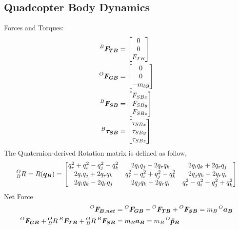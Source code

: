 \subsection{Quadcopter Body Dynamics}
Forces and Torques:
\begin{align*}
  \prescript{B}{}{\bm{F_{TB}}} &=
  \begin{bmatrix}
    0 \\ 0 \\ F_{TB}
  \end{bmatrix} \\
  \prescript{O}{}{\bm{F_{GB}}} &=
  \begin{bmatrix}
    0 \\ 0 \\ -m_b g
  \end{bmatrix} \\
  \prescript{B}{}{\bm{F_{SB}}} &=
  \begin{bmatrix}
    F_{SBx} \\ F_{SBy} \\ F_{SBz} 
  \end{bmatrix} \\
  \prescript{B}{}{\bm{\tau_{SB}}} &=
  \begin{bmatrix}
    \tau_{SBx} \\ \tau_{SBy} \\ \tau_{SBz} 
  \end{bmatrix}
\end{align*}
The Quaternion-derived Rotation matrix is defined as follow,
\begin{align*}
  \prescript{O}{B}{R} = R(\bm{q_B}) =
  \begin{bmatrix}
    q_r^2 + q_i^2 - q_j^2 - q_k^2 & 2q_iq_j - 2q_rq_k & 2q_iq_k + 2q_rq_j \\
    2q_iq_j + 2q_rq_k & q_r^2 - q_i^2 + q_j^2 - q_k^2 & 2q_jq_k - 2q_rq_i \\
    2q_iq_k - 2q_rq_j & 2q_jq_k + 2q_rq_i & q_r^2 - q_i^2 - q_j^2 +q_k^2
  \end{bmatrix}
\end{align*}
Net Force
\begin{align*}
  \prescript{O}{}{\bm{F_{B, net}}} &= \prescript{O}{}{\bm{F_{GB}}} + \prescript{O}{}{\bm{F_{TB}}} + \prescript{O}{}{\bm{F_{SB}}} = m_B \prescript{O}{}{\bm{a_B}} \\
  \prescript{O}{}{\bm{F_{GB}}} + \prescript{O}{B}{R} \prescript{B}{}{\bm{F_{TB}}} + \prescript{O}{B}{R} \prescript{B}{}{\bm{F_{SB}}} &= m_B \bm{a_B} = m_B \prescript{O}{}{\bm{\ddot{p}_B}}
\end{align*}
